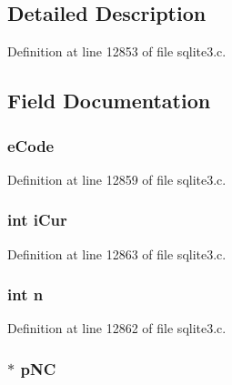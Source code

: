\subsection{Detailed Description}


Definition at line 12853 of file sqlite3.\+c.



\subsection{Field Documentation}
\hypertarget{struct_walker_a9722ca12532d3d55b851ac6f586c51a2}{}
\subsubsection[{e\+Code}]{ e\+Code}\label{struct_walker_a9722ca12532d3d55b851ac6f586c51a2}


Definition at line 12859 of file sqlite3.\+c.

\hypertarget{struct_walker_ad4234df4b7f768520fbd6a92a2b0023c}{}
\subsubsection[{i\+Cur}]{\setlength{\rightskip}{0pt plus 5cm}int i\+Cur}\label{struct_walker_ad4234df4b7f768520fbd6a92a2b0023c}


Definition at line 12863 of file sqlite3.\+c.

\hypertarget{struct_walker_a76f11d9a0a47b94f72c2d0e77fb32240}{}
\subsubsection[{n}]{\setlength{\rightskip}{0pt plus 5cm}int n}\label{struct_walker_a76f11d9a0a47b94f72c2d0e77fb32240}


Definition at line 12862 of file sqlite3.\+c.

\hypertarget{struct_walker_ab8e4596de9a977e3a52462ae8d1f7b7a}{}
\subsubsection[{p\+N\+C}]{$\ast$ p\+N\+C}\label{struct_walker_ab8e4596de9a977e3a52462ae8d1f7b7a}


